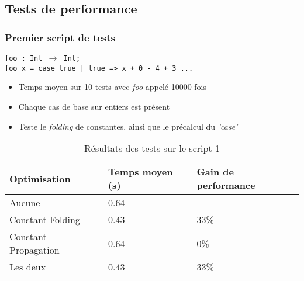 \documentclass{beamer}
\begin{document}
\subsection{Tests de performance}
\begin{frame}
    \frametitle{Premier script de tests}
    \texttt{foo : Int $\rightarrow$ Int;\\
    foo x = case true
    | true => x + 0 - 4 + 3 ...}\\
    \bigskip
    \begin{itemize}
      \item Temps moyen sur 10 tests avec \emph{foo} appelé 10000 fois
      \item Chaque cas de base sur entiers est présent
      \item Teste le \emph{folding} de constantes, ainsi que le précalcul du \emph{'case'}
    \end{itemize}

    \begin{table}
      \begin{tabular}{l l l}
        \toprule
        \textbf{Optimisation} & \textbf{Temps moyen (s)} & \textbf{Gain de performance}\\
        \midrule
        Aucune & 0.64 & - \\
        Constant Folding & 0.43 & 33\% \\
        Constant Propagation & 0.64 & 0\% \\
        Les deux & 0.43 & 33\% \\
        \bottomrule
      \end{tabular}
      \caption{Résultats des tests sur le script 1}
    \end{table}
\end{frame}
\end{document}
